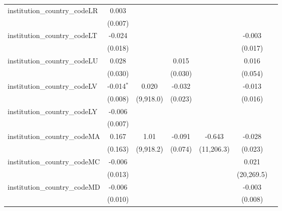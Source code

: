 \begin{tabular}{lcccccc}
   institution\_country\_codeLR          & 0.003          &               &               &              &              &   \\   
                                         & (0.007)        &               &               &              &              &   \\   
   institution\_country\_codeLT          & -0.024         &               &               &              & -0.003       &   \\   
                                         & (0.018)        &               &               &              & (0.017)      &   \\   
   institution\_country\_codeLU          & 0.028          &               & 0.015         &              & 0.016        &   \\   
                                         & (0.030)        &               & (0.030)       &              & (0.054)      &   \\   
   institution\_country\_codeLV          & -0.014$^{*}$   & 0.020         & -0.032        &              & -0.013       &   \\   
                                         & (0.008)        & (9,918.0)     & (0.023)       &              & (0.016)      &   \\   
   institution\_country\_codeLY          & -0.006         &               &               &              &              &   \\   
                                         & (0.007)        &               &               &              &              &   \\   
   institution\_country\_codeMA          & 0.167          & 1.01          & -0.091        & -0.643       & -0.028       &   \\   
                                         & (0.163)        & (9,918.2)     & (0.074)       & (11,206.3)   & (0.023)      &   \\   
   institution\_country\_codeMC          & -0.006         &               &               &              & 0.021        &   \\   
                                         & (0.013)        &               &               &              & (20,269.5)   &   \\   
   institution\_country\_codeMD          & -0.006         &               &               &              & -0.003       &   \\   
                                         & (0.010)        &               &               &              & (0.008)      &   \\   

\end{tabular}
